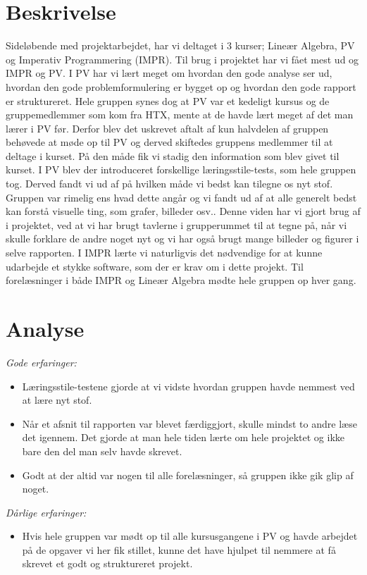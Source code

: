 \section{Beskrivelse}
Sideløbende med projektarbejdet, har vi deltaget i 3 kurser; Lineær Algebra, PV og Imperativ Programmering (IMPR). Til brug i projektet har vi fået mest ud og IMPR og PV. I PV har vi lært meget om hvordan den gode analyse ser ud, hvordan den gode problemformulering er bygget op og hvordan den gode rapport er struktureret. Hele gruppen synes dog at PV var et kedeligt kursus og de gruppemedlemmer som kom fra HTX, mente at de havde lært meget af det man lærer i PV før. Derfor blev det uskrevet aftalt af kun halvdelen af gruppen behøvede at møde op til PV og derved skiftedes gruppens medlemmer til at deltage i kurset. På den måde fik vi stadig den information som blev givet til kurset.
I PV blev der introduceret forskellige læringsstile-tests, som hele gruppen tog. Derved fandt vi ud af på hvilken måde vi bedst kan tilegne os nyt stof. Gruppen var rimelig ens hvad dette angår og vi fandt ud af at alle generelt bedst kan forstå visuelle ting, som grafer, billeder osv.. Denne viden har vi gjort brug af i projektet, ved at vi har brugt tavlerne i grupperummet til at tegne på, når vi skulle forklare de andre noget nyt og vi har også brugt mange billeder og figurer i selve rapporten. 
I IMPR lærte vi naturligvis det nødvendige for at kunne udarbejde et stykke software, som der er krav om i dette projekt. Til forelæsninger i både IMPR og Lineær Algebra mødte hele gruppen op hver gang. 

\section{Analyse}

\emph{Gode erfaringer:}
\begin{itemize}
\item	Læringsstile-testene gjorde at vi vidste hvordan gruppen havde nemmest ved at lære nyt stof. 

\item	 Når et afsnit til rapporten var blevet færdiggjort, skulle mindst to andre læse det igennem. Det gjorde at man hele tiden lærte om hele projektet og ikke bare den del man selv havde skrevet. 

\item	Godt at der altid var nogen til alle forelæsninger, så gruppen ikke gik glip af noget.
\end{itemize}\emph{Dårlige erfaringer:}
\begin{itemize}
\item	Hvis hele gruppen var mødt op til alle kursusgangene i PV og havde arbejdet på de opgaver vi her fik stillet, kunne det have hjulpet til nemmere at få skrevet et godt og struktureret projekt. 

\end{itemize}	 

